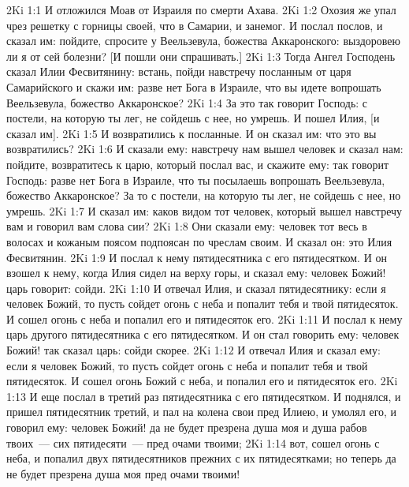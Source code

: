 \vs 2Ki 1:1 И отложился Моав от Израиля по смерти Ахава.
\vs 2Ki 1:2 Охозия же упал чрез решетку с горницы своей, что в Самарии, и занемог. И послал послов, и сказал им: пойдите, спросите у Веельзевула, божества Аккаронского: выздоровею ли я от сей болезни? [И пошли они спрашивать.]
\rsbpar\vs 2Ki 1:3 Тогда Ангел Господень сказал Илии Фесвитянину: встань, пойди навстречу посланным от царя Самарийского и скажи им: разве нет Бога в Израиле, что вы идете вопрошать Веельзевула, божество Аккаронское?
\vs 2Ki 1:4 За это так говорит Господь: с постели, на которую ты лег, не сойдешь с нее, но умрешь. И пошел Илия, [и сказал им].
\vs 2Ki 1:5 И возвратились к  посланные. И он сказал им: что это вы возвратились?
\vs 2Ki 1:6 И сказали ему: навстречу нам вышел человек и сказал нам: пойдите, возвратитесь к царю, который послал вас, и скажите ему: так говорит Господь: разве нет Бога в Израиле, что ты посылаешь вопрошать Веельзевула, божество Аккаронское? За то с постели, на которую ты лег, не сойдешь с нее, но умрешь.
\vs 2Ki 1:7 И сказал им: каков видом тот человек, который вышел навстречу вам и говорил вам слова сии?
\vs 2Ki 1:8 Они сказали ему: человек тот весь в волосах и кожаным поясом подпоясан по чреслам своим. И сказал он: это Илия Фесвитянин.
\vs 2Ki 1:9 И послал к нему пятидесятника с его пятидесятком. И он взошел к нему, когда Илия сидел на верху горы, и сказал ему: человек Божий! царь говорит: сойди.
\vs 2Ki 1:10 И отвечал Илия, и сказал пятидесятнику: если я человек Божий, то пусть сойдет огонь с неба и попалит тебя и твой пятидесяток. И сошел огонь с неба и попалил его и пятидесяток его.
\vs 2Ki 1:11 И послал к нему царь другого пятидесятника с его пятидесятком. И он стал говорить ему: человек Божий! так сказал царь: сойди скорее.
\vs 2Ki 1:12 И отвечал Илия и сказал ему: если я человек Божий, то пусть сойдет огонь с неба и попалит тебя и твой пятидесяток. И сошел огонь Божий с неба, и попалил его и пятидесяток его.
\vs 2Ki 1:13 И еще послал в третий раз пятидесятника с его пятидесятком. И поднялся, и пришел пятидесятник третий, и пал на колена свои пред Илиею, и умолял его, и говорил ему: человек Божий! да не будет презрена душа моя и душа рабов твоих~--- сих пятидесяти~--- пред очами твоими;
\vs 2Ki 1:14 вот, сошел огонь с неба, и попалил двух пятидесятников прежних с их пятидесятками; но теперь да не будет презрена душа моя пред очами твоими!
